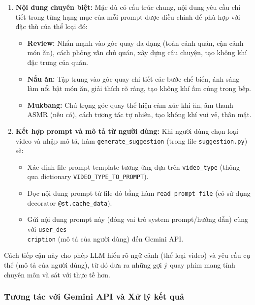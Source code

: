 \begin{enumerate}
    \item \textbf{Nội dung chuyên biệt:} Mặc dù có cấu trúc chung, nội dung yêu cầu chi tiết trong từng hạng mục của mỗi prompt được điều chỉnh để phù hợp với đặc thù của thể loại đó:
    \begin{itemize}
        \item \textbf{Review:} Nhấn mạnh vào góc quay đa dạng (toàn cảnh quán, cận cảnh món ăn), cách phỏng vấn chủ quán, xây dựng câu chuyện, tạo không khí đặc trưng của quán.
        
        \item \textbf{Nấu ăn:} Tập trung vào góc quay chi tiết các bước chế biến, ánh sáng làm nổi bật món ăn, giải thích rõ ràng, tạo không khí ấm cúng trong bếp.
        
        \item \textbf{Mukbang:} Chú trọng góc quay thể hiện cảm xúc khi ăn, âm thanh ASMR (nếu có), cách tương tác tự nhiên, tạo không khí vui vẻ, thân mật.
    \end{itemize}
    
    \item \textbf{Kết hợp prompt và mô tả từ người dùng:} Khi người dùng chọn loại video và nhập mô tả, hàm \texttt{generate\_suggestion} (trong file \texttt{suggestion.py}) sẽ:
    \begin{itemize}
        \item Xác định file prompt template tương ứng dựa trên \texttt{video\_type} (thông qua dictionary \texttt{VIDEO\_TYPE\_TO\_PROMPT}).
        
        \item Đọc nội dung prompt từ file đó bằng hàm \texttt{read\_prompt\_file} (có sử dụng decorator \texttt{@st.cache\_data}).
        
        \item Gửi nội dung prompt này (đóng vai trò system prompt/hướng dẫn) cùng với \texttt{user\_des-\\cription} (mô tả của người dùng) đến Gemini API.
    \end{itemize}
\end{enumerate}

Cách tiếp cận này cho phép LLM hiểu rõ ngữ cảnh (thể loại video) và yêu cầu cụ thể (mô tả của người dùng), từ đó đưa ra những gợi ý quay phim mang tính chuyên môn và sát với thực tế hơn.

\subsubsection{Tương tác với Gemini API và Xử lý kết quả}

